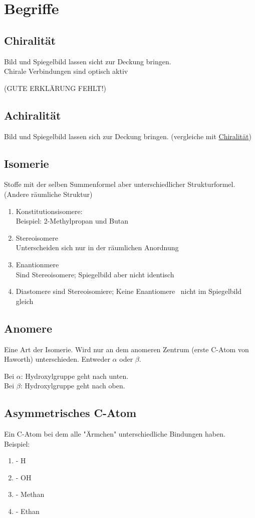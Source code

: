 
\section{Begriffe} \label{sec:begriffe}


\subsection{Chiralität} \label{sec:chiral}
Bild und Spiegelbild lassen sicht zur Deckung bringen. \\
Chirale Verbindungen sind optisch aktiv 

(GUTE ERKLÄRUNG FEHLT!)

\subsection{Achiralität}
Bild und Spiegelbild lassen sich zur Deckung bringen. (vergleiche mit \hyperref[sec:chiral]{Chiralität})

\subsection{Isomerie}
Stoffe mit der selben Summenformel aber unterschiedlicher Strukturformel. (Andere räumliche Struktur)
\begin{enumerate}
    \item Konstitutionsisomere: \\
        Beispiel: 2-Methylpropan und Butan
    \item Stereoisomere \\
        Unterscheiden sich nur in der räumlichen Anordnung
    \item Enantionmere \\
        Sind Stereoisomere; Spiegelbild aber nicht identisch
    \item Diastomere
        sind Stereoisomiere; Keine Enantiomere \textrightarrow\ nicht im Spiegelbild gleich
\end{enumerate}

\subsection{Anomere}
Eine Art der Isomerie. 
Wird nur an dem anomeren Zentrum (erste C-Atom von Haworth) unterschieden.
Entweder $\alpha$ oder $\beta$. 

Bei $\alpha$: Hydroxylgruppe geht nach unten.\\
Bei $\beta$: Hydroxylgruppe geht nach oben.

\subsection{Asymmetrisches C-Atom}
Ein C-Atom bei dem alle "Ärmchen" unterschiedliche Bindungen haben. \\
Beispiel:
\begin{enumerate}
    \item - H
    \item - OH
    \item - Methan
    \item - Ethan
\end{enumerate}

